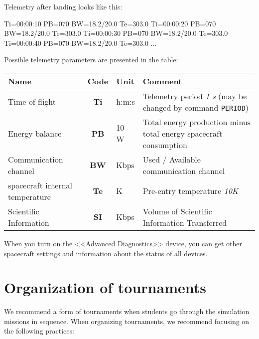\documentclass[12pt,a4paper]{article}
\begin{document}
Telemetry after landing looks like this:

\begin{verbatim*}
Ti=00:00:10 PB=070 BW=18.2/20.0 Te=303.0
Ti=00:00:20 PB=070 BW=18.2/20.0 Te=303.0
Ti=00:00:30 PB=070 BW=18.2/20.0 Te=303.0
Ti=00:00:40 PB=070 BW=18.2/20.0 Te=303.0
...
\end{verbatim*}

Possible telemetry parameters are presented in the table:

\begin{center}
\begin{tabular}{ |p{4cm}|c|p{2.5cm}|p{6cm}| }
  \hline
  \textbf{Name} & \textbf{Code} & \textbf{Unit} & \textbf{Comment} \\
   \hline
   Time of flight & \textbf{Ti} & h:m:s & Telemetry period \emph{1 s} (may be
   changed by command \verb'PERIOD')\\
   \hline
   Energy balance & \textbf{PB} & 10 W & Total energy production minus total energy
   spacecraft consumption\\
   \hline
   Communication channel & \textbf{BW} & Kbps & Used / Available communication channel\\
   \hline
   spacecraft internal temperature & \textbf{Te} & K & Pre-entry temperature \emph{10K}\\
   \hline
   Scientific Information & \textbf{SI} & Kbps & Volume of Scientific Information Transferred\\
   \hline
\end{tabular}
\end{center}

When you turn on the <<Advanced Diagnostics>> device, you can get other spacecraft settings and information about the status of all devices.

\section{Organization of tournaments}

We recommend a form of tournaments when students go through the simulation missions in sequence. When organizing tournaments, we recommend focusing on the following practices:
\end{document}
